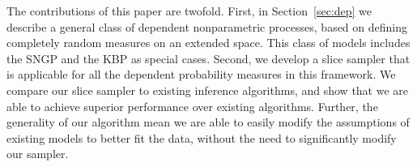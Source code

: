 The contributions of this paper are twofold.  First, in Section~\ref{sec:dep}
we describe a general class of dependent nonparametric processes, based on
defining completely random measures on an extended space.  This class of models
includes the SNGP and the KBP as special cases. Second, we develop a
slice sampler that is applicable for all the dependent probability measures in
this framework. We compare our slice sampler to existing inference algorithms,
and show that we are able to achieve superior performance over existing
algorithms. Further, the generality of our algorithm mean we are able to easily
modify the assumptions of existing models to better fit the data, without the
need to significantly modify our sampler.


